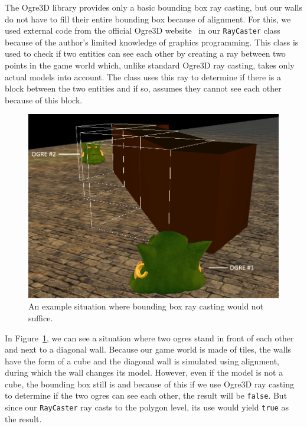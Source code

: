 The Ogre3D library provides only a basic bounding box ray casting, but our walls do not have to fill their entire bounding box because of
alignment. For this, we used external code from the official Ogre3D website~\cite{Ogre3DRaycasting} in our \texttt{RayCaster} class
because of the author's limited knowledge of graphics programming. This class is used to check if two entities can see each other by creating
a ray between two points in the game world which, unlike standard Ogre3D ray casting, takes only actual models into account. The class
uses this ray to determine if there is a block between the two entities and if so, assumes they cannot see each other because of this
block.

\begin{figure}[h]
    \centering
    \includegraphics[width=\columnwidth]{../img/los-problem.png}
    \caption{An example situation where bounding box ray casting would not suffice.}
    \label{los-problem}
\end{figure}

In Figure~\ref{los-problem}, we can see a situation where two ogres stand in front of each other and next to a diagonal wall. Because our
game world is made of tiles, the walls have the form of a cube and the diagonal wall is simulated using alignment, during which the wall
changes its model. However, even if the model is not a cube, the bounding box still is and because of this if we use Ogre3D ray casting
to determine if the two ogres can see each other, the result will be \texttt{false}. But since our \texttt{RayCaster} ray casts to
the polygon level, its use would yield \texttt{true} as the result.

